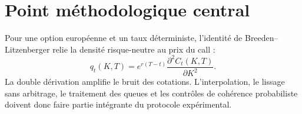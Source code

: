 \documentclass[11pt,a4paper]{article}
\begin{document}
\section*{Point méthodologique central}

Pour une option européenne et un taux déterministe, l'identité de
Breeden--Litzenberger relie la densité risque-neutre au prix du call :
\[
q_t(K,T)=e^{r(T-t)}\frac{\partial^2 C_t(K,T)}{\partial K^2}.
\]
La double dérivation amplifie le bruit des cotations. L'interpolation, le lissage
sans arbitrage, le traitement des queues et les contrôles de cohérence probabiliste
doivent donc faire partie intégrante du protocole expérimental.

\nocite{*}
\printbibliography[title={Références}]
\end{document}
